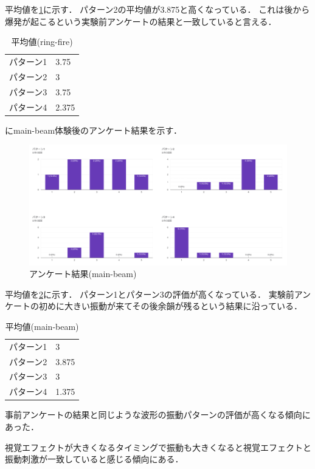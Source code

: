 平均値を\ref{tab;ringAve}に示す．
パターン2の平均値が3.875と高くなっている．
これは後から爆発が起こるという実験前アンケートの結果と一致していると言える．

\begin{table}[h]
    \caption{平均値(ring-fire)}
    \centering
    \begin{tabular}{l|l}
    \hline
    \hline
    パターン1 & 3.75\\
    パターン2 & 3\\
    パターン3 & 3.75\\
    パターン4 & 2.375\\
    \hline
    \end{tabular}
    \label{tab;ringAve}
\end{table}

にmain-beam体験後のアンケート結果を示す．

\begin{figure}[h]
  \centering
  \includegraphics[clip,width=14cm]{fig/mainbeamAnk.png}
  \caption{アンケート結果(main-beam)}\label{mainAnk}
  \end{figure}


平均値を\ref{tab;mainAve}に示す．
パターン1とパターン3の評価が高くなっている．
実験前アンケートの初めに大きい振動が来てその後余韻が残るという結果に沿っている．

  \begin{table}[H]
    \caption{平均値(main-beam)}
    \centering
    \begin{tabular}{l|l}
    \hline
    \hline
    パターン1 & 3\\
    パターン2 & 3.875\\
    パターン3 & 3\\
    パターン4 & 1.375\\
    \hline
    \end{tabular}
    \label{tab;mainAve}
\end{table}

事前アンケートの結果と同じような波形の振動パターンの評価が高くなる傾向にあった．

視覚エフェクトが大きくなるタイミングで振動も大きくなると視覚エフェクトと振動刺激が一致していると感じる傾向にある．


